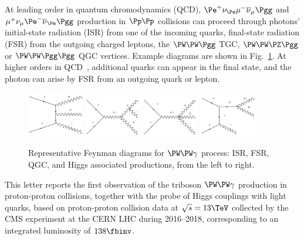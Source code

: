 \documentclass[11pt,twoside,a4paper,cmspaper]{cms-tdr}
\begin{document}
At leading order in quantum chromodynamics (QCD), $\Pe^+\nu_{\Pe}\mu^-\overline{\nu}_{\mu}\Pgg$ and $\mu^+\nu_{\mu}\Pe^-\overline{\nu}_{\Pe}\Pgg$ production in $\Pp\Pp$ collisions can proceed through photons' initial-state radiation (ISR) from one of the incoming quarks, final-state radiation (FSR) from the outgoing charged leptons, the $\PW\PW\Pgg$ TGC, $\PW\PW\PZ\Pgg$ or $\PW\PW\Pgg\Pgg$ QGC vertices. Example diagrams are shown in Fig.~\ref{fig:LO diagrams}. At higher orders in QCD~\cite{Zhu:2020ous}, additional quarks can appear in the final state, and the photon can arise by FSR from an outgoing quark or lepton. 

\begin{figure}[htp]
    \centering
    \includegraphics[width=0.22\textwidth]{ISR.pdf}
    \includegraphics[width=0.22\textwidth]{FSR.pdf}
    \includegraphics[width=0.22\textwidth]{aQGC.pdf}
    \includegraphics[width=0.22\textwidth]{HG.pdf}
    \caption{Representative Feynman diagrams for $\PW\PW\gamma$ process: ISR, FSR, QGC, and Higgs associated productions, from the left to right.}
    \label{fig:LO diagrams}
\end{figure}

This letter reports the first observation of the triboson $\PW\PW\gamma$ production in proton-proton collisions, together with the probe of Higgs couplings with light quarks, based on proton-proton collision data at $\sqrt{s} = 13\TeV$ collected by the CMS experiment at the CERN LHC during 2016--2018, corresponding to an integrated luminosity of $138\fbinv$.
\end{document}
